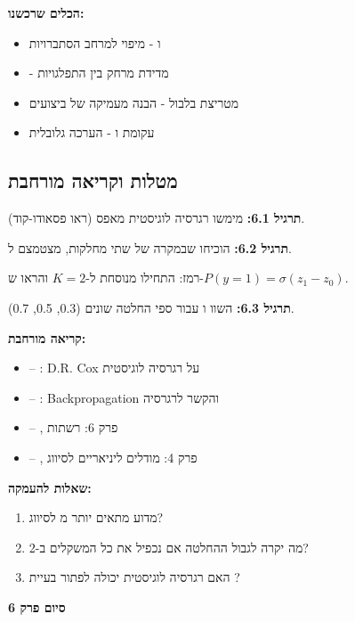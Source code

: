 \textbf{הכלים שרכשנו:}

\begin{itemize}
\item {} ו - מיפוי למרחב הסתברויות
\item {} - מדידת מרחק בין התפלגויות
\item מטריצת בלבול - הבנה מעמיקה של ביצועים
\item עקומת  ו - הערכה גלובלית
\end{itemize}

\subsection*{מטלות וקריאה מורחבת}

\textbf{תרגיל \num{6.1}:} מימשו רגרסיה לוגיסטית מאפס (ראו פסאודו-קוד).

\textbf{תרגיל \num{6.2}:} הוכיחו שבמקרה של שתי מחלקות,  מצטמצם ל.

רמז: התחילו מנוסחת  ל-$K=2$ והראו ש-$P(y=1) = \sigma(z_1 - z_0)$.

\textbf{תרגיל \num{6.3}:} השוו  ו עבור ספי החלטה שונים (\num{0.3}, \num{0.5}, \num{0.7}).

\textbf{קריאה מורחבת:}

\begin{itemize}
\item \cite{cox1958} – : D.R. Cox על רגרסיה לוגיסטית
\item \cite{rumelhart1986} – : Backpropagation והקשר לרגרסיה
\item \cite{goodfellow2016} – , פרק \num{6}: רשתות 
\item \cite{bishop2006} – , פרק \num{4}: מודלים ליניאריים לסיווג
\end{itemize}

\textbf{שאלות להעמקה:}

\begin{enumerate}
\item מדוע  מתאים יותר מ לסיווג?
\item מה יקרה לגבול ההחלטה אם נכפיל את כל המשקלים ב-\num{2}?
\item האם רגרסיה לוגיסטית יכולה לפתור בעיית ?
\end{enumerate}

\textbf{סיום פרק \num{6}}
